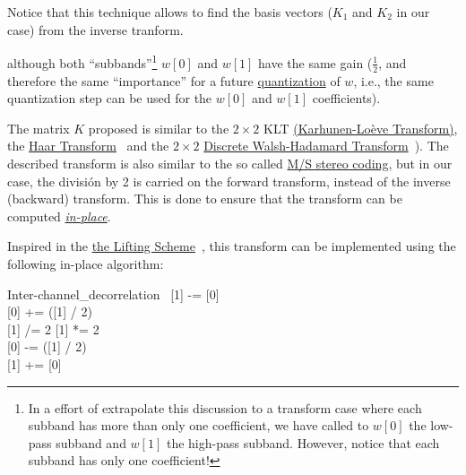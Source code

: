 Notice that this technique allows to find the basis vectors ($K_1$ and
$K_2$ in our case) from the inverse tranform.
  

although both ``subbands''\footnote{In a effort of extrapolate this
discussion to a transform case where each subband has more than only
one coefficient, we have called to $w[0]$ the low-pass subband and
$w[1]$ the high-pass subband. However, notice that each subband has
only one coefficient!} $w[0]$ and $w[1]$ have the same gain
($\frac{1}{2}$, and therefore the same ``importance'' for a
future
\href{https://en.wikipedia.org/wiki/Quantization_(signal_processing)}{quantization}
of $w$, i.e., the same quantization step can be used for the $w[0]$
and $w[1]$ coefficients).

The matrix $K$ proposed is similar to the $2\times 2$ KLT
\href{http://fourier.eng.hmc.edu/e161/lectures/klt/node3.html}{(Karhunen-Lo\`eve
  Transform)}, the
\href{http://wavelets.pybytes.com/wavelet/haar/}{Haar
  Transform}~\cite{vetterli1995wavelets} and the $2\times 2$
\href{https://en.wikipedia.org/wiki/Hadamard_transform}{Discrete
  Walsh-Hadamard Transform}~\cite{sayood2017introduction}).  The
described transform is also similar to the so called
\href{https://en.wikipedia.org/wiki/Joint_encoding#M/S_stereo_coding}{M/S
  stereo coding}, but in our case, the división by 2 is carried on the
forward transform, instead of the inverse (backward) transform. This
is done to ensure that the transform can be computed
\href{https://en.wikipedia.org/wiki/In-place_algorithm}{\emph{in-place}}.



Inspired in the
\href{https://cm-bell-labs.github.io/who/wim/papers/athome/athome.pdf}{the
  Lifting Scheme}~\cite{2006.sweldens}, this transform can be
implemented using the following in-place algorithm:

\begin{pseudocode}{Inter-channel\_decorrelation}{~}
  \BEGIN
    [1] -= [0] \\
    [0] += ([1] / 2) \\
    [1] /= 2
  \END
  \ENDPROCEDURE
  \BEGIN
    [1] *= 2 \\
    [0] -= ([1] / 2) \\
    [1] += [0]
  \END
  \ENDPROCEDURE
\end{pseudocode}

